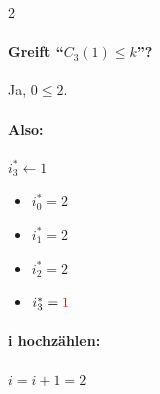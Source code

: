 \begin{multicols}{2}
    \paragraph{Greift ``$C_3(1)\le k$''?} Ja, $0 \le 2$.
    \paragraph{Also:} $i_3^\ast \gets 1$
    \columnbreak
    \begin{itemize}
        \item $i_0^\ast = 2$
        \item $i_1^\ast = 2 $
        \item $i_2^\ast = 2$
        \item $i_3^\ast = \textcolor{red}{1} $
    \end{itemize}
\end{multicols}

\paragraph{i hochzählen:} $i = i + 1 = 2$

